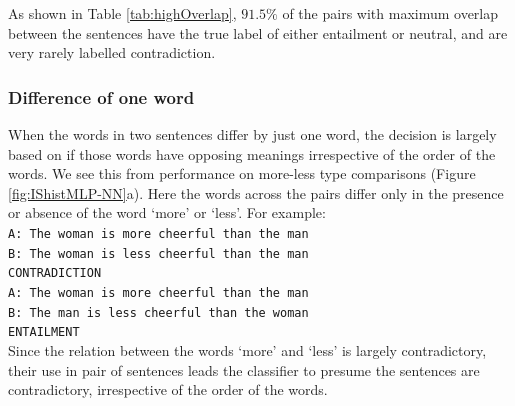 \documentclass[10pt,letterpaper]{article}
\begin{document}
\begin{table}[htb]
 \caption{High Overlap of words in SNLI}
  \label{tab:highOverlap}
\end{table}

As shown in Table \ref{tab:highOverlap}, $91.5\%$ of the pairs with maximum overlap between the sentences have the true label of either entailment or neutral, and are very rarely labelled contradiction. 

\subsubsection{Difference of one word}

When the words in two sentences differ by just one word, the decision is largely based on if those words have opposing meanings irrespective of the order of the words. We see this from performance on more-less type comparisons (Figure \ref{fig:IShistMLP-NN}a). Here the words across the pairs differ only in the presence or absence of the word `more' or `less'. For example:\\
{\tt A: The woman is more cheerful than the man \\ B: The woman is less cheerful than the man\\ CONTRADICTION \\}{\tt A: The woman is more cheerful than the man \\ B: The man is less cheerful than the woman \\ ENTAILMENT} \\
Since the relation between the words `more' and `less' is largely contradictory, their use in pair of sentences leads the classifier to presume the sentences are contradictory, irrespective of the order of the words. 
\end{document}
